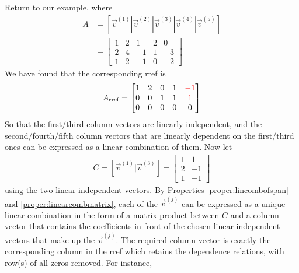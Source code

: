 Return to our example, where
\begin{align*}
A &= [\vec{v}^{(1)}|\vec{v}^{(2)}|\vec{v}^{(3)}|\vec{v}^{(4)}|\vec{v}^{(5)}] \\
&= 
\begin{bmatrix}
1 & 2 & 1 & 2 & 0 \\
2 & 4 & -1 & 1 & -3\\
1 & 2 & -1 & 0 & -2
\end{bmatrix}
\end{align*}
We have found that the corresponding rref is
\begin{align*}
A_{\text{rref}} =
\begin{bmatrix}
1 & 2 & 0 & 1 & \textcolor{red}{-1} \\
0 & 0 & 1 & 1 & \textcolor{red}{1} \\
0 & 0 & 0 & 0 & 0
\end{bmatrix}
\end{align*}
So that the first/third column vectors are linearly independent, and the second/fourth/fifth column vectors that are linearly dependent on the first/third ones can be expressed as a linear combination of them. Now let
\begin{align*}
C = [\vec{v}^{(1)}|\vec{v}^{(3)}] = \begin{bmatrix}
1 & 1 \\
2 & -1 \\
1 & -1
\end{bmatrix}
\end{align*}
using the two linear independent vectors. By Properties \ref{proper:lincombofspan} and \ref{proper:linearcombmatrix}, each of the $\vec{v}^{(j)}$ can be expressed as a unique linear combination in the form of a matrix product between $C$ and a column vector that contains the coefficients in front of the chosen linear independent vectors that make up the $\vec{v}^{(j)}$. The required column vector is exactly the corresponding column in the rref which retains the dependence relations, with row(s) of all zeros removed. For instance,
